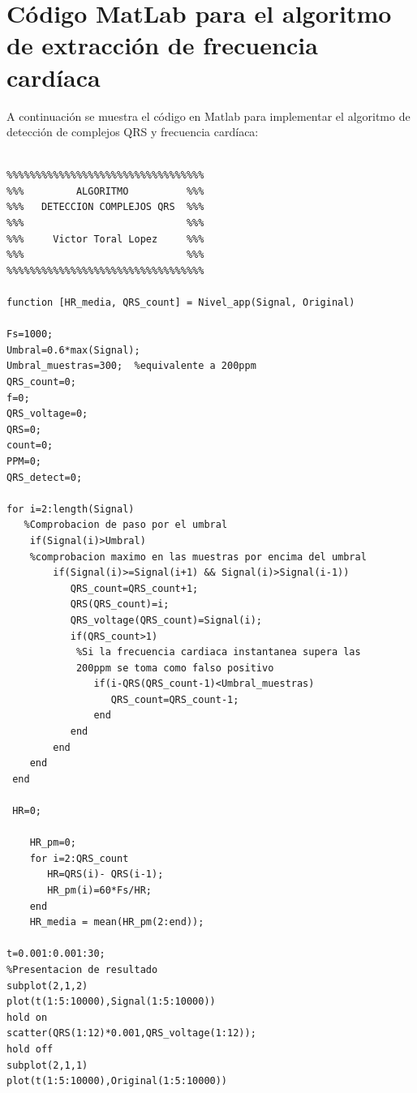 
\newpage\null\thispagestyle{empty}\newpage
\appendix
{}
\begin{Huge}
	\begin{center}
	\textbf{\appendixname}
	\end{center}
\end{Huge}

\lhead{\appendixname}

\renewcommand{\thesection}{\Alph{section}}

\section{Código MatLab para el algoritmo de extracción de frecuencia cardíaca}

A continuación se muestra el código en Matlab para implementar el algoritmo de detección de complejos QRS y frecuencia cardíaca:

\begin{lstlisting}[style= Matlab-editor]

%%%%%%%%%%%%%%%%%%%%%%%%%%%%%%%%%%
%%%         ALGORITMO          %%%   
%%%   DETECCION COMPLEJOS QRS  %%%   
%%%                            %%%   
%%%     Victor Toral Lopez     %%%
%%%                            %%%   
%%%%%%%%%%%%%%%%%%%%%%%%%%%%%%%%%%

function [HR_media, QRS_count] = Nivel_app(Signal, Original)

Fs=1000;
Umbral=0.6*max(Signal);
Umbral_muestras=300;  %equivalente a 200ppm
QRS_count=0;
f=0;
QRS_voltage=0;
QRS=0;
count=0;
PPM=0;
QRS_detect=0;

for i=2:length(Signal)
   %Comprobacion de paso por el umbral
    if(Signal(i)>Umbral)
    %comprobacion maximo en las muestras por encima del umbral      
        if(Signal(i)>=Signal(i+1) && Signal(i)>Signal(i-1))
           QRS_count=QRS_count+1;
           QRS(QRS_count)=i; 
           QRS_voltage(QRS_count)=Signal(i);
           if(QRS_count>1)
            %Si la frecuencia cardiaca instantanea supera las 
            200ppm se toma como falso positivo
               if(i-QRS(QRS_count-1)<Umbral_muestras)
                  QRS_count=QRS_count-1;
               end
           end
        end
    end
 end  

 HR=0;
 
    HR_pm=0;
    for i=2:QRS_count
       HR=QRS(i)- QRS(i-1);  
       HR_pm(i)=60*Fs/HR;  
    end
    HR_media = mean(HR_pm(2:end));
    
t=0.001:0.001:30;
%Presentacion de resultado
subplot(2,1,2)
plot(t(1:5:10000),Signal(1:5:10000)) 
hold on
scatter(QRS(1:12)*0.001,QRS_voltage(1:12));
hold off
subplot(2,1,1)
plot(t(1:5:10000),Original(1:5:10000))
	

\end{lstlisting}

